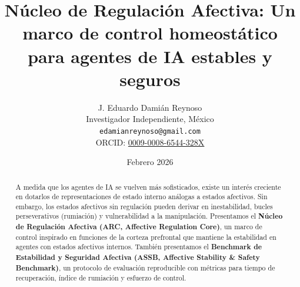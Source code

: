 \documentclass{article}
\title{Núcleo de Regulación Afectiva: Un marco de control homeostático para agentes de IA estables y seguros}
\author{
  J. Eduardo {Dami\'{a}n Reynoso} \\
  Investigador Independiente, M\'{e}xico \\
  \texttt{edamianreynoso@gmail.com} \\
  ORCID: \href{https://orcid.org/0009-0008-6544-328X}{0009-0008-6544-328X}
}
\date{Febrero 2026}
\begin{document}
\maketitle

\begin{abstract}
A medida que los agentes de IA se vuelven más sofisticados, existe un interés creciente en dotarlos de representaciones de estado interno análogas a estados afectivos. Sin embargo, los estados afectivos sin regulación pueden derivar en inestabilidad, bucles perseverativos (rumiación) y vulnerabilidad a la manipulación. Presentamos el \textbf{Núcleo de Regulación Afectiva (ARC, Affective Regulation Core)}, un marco de control inspirado en funciones de la corteza prefrontal que mantiene la estabilidad en agentes con estados afectivos internos. También presentamos el \textbf{Benchmark de Estabilidad y Seguridad Afectiva (ASSB, Affective Stability \& Safety Benchmark)}, un protocolo de evaluación reproducible con métricas para tiempo de recuperación, índice de rumiación y esfuerzo de control.


\end{abstract}
\end{document}
